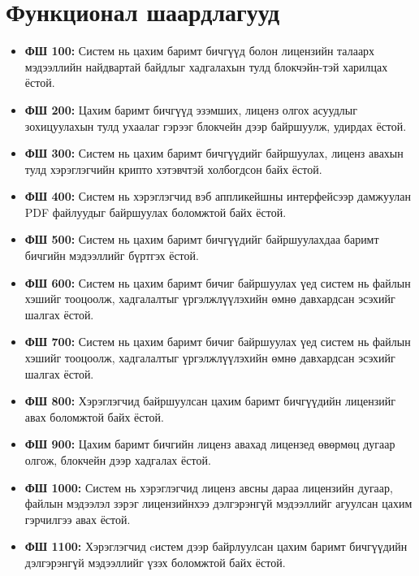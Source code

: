 \section{Функционал шаардлагууд}
\begin{itemize}
      \item \textbf{ФШ 100:} Систем нь цахим баримт бичгүүд болон лицензийн талаарх мэдээллийн найдвартай байдлыг хадгалахын тулд блокчэйн-тэй харилцах ёстой.
      \item \textbf{ФШ 200:} Цахим баримт бичгүүд эзэмших, лиценз олгох асуудлыг зохицуулахын тулд ухаалаг гэрээг блокчейн дээр байршуулж, удирдах ёстой.
      \item \textbf{ФШ 300:} Систем нь цахим баримт бичгүүдийг байршуулах, лиценз авахын тулд  хэрэглэгчийн крипто хэтэвчтэй холбогдсон байх ёстой.
      \item \textbf{ФШ 400:} Систем нь хэрэглэгчид вэб аппликейшны интерфейсээр дамжуулан PDF файлуудыг байршуулах боломжтой байх ёстой.
      \item \textbf{ФШ 500:} Систем нь цахим баримт бичгүүдийг байршуулахдаа баримт бичгийн мэдээллийг бүртгэх ёстой.
      \item \textbf{ФШ 600:} Систем нь цахим баримт бичиг байршуулах үед систем нь файлын хэшийг тооцоолж, хадгалалтыг үргэлжлүүлэхийн өмнө давхардсан эсэхийг шалгах ёстой.
      \item \textbf{ФШ 700:} Систем нь цахим баримт бичиг байршуулах үед систем нь файлын хэшийг тооцоолж, хадгалалтыг үргэлжлүүлэхийн өмнө давхардсан эсэхийг шалгах ёстой.
      \item \textbf{ФШ 800:} Хэрэглэгчид байршуулсан цахим баримт бичгүүдийн лицензийг авах боломжтой байх ёстой.
      \item \textbf{ФШ 900:} Цахим баримт бичгийн лиценз авахад лицензед өвөрмөц дугаар олгож, блокчейн дээр хадгалах ёстой.
      \item \textbf{ФШ 1000:} Систем нь хэрэглэгчид лиценз авсны дараа лицензийн дугаар, файлын мэдээлэл зэрэг лицензийнхээ дэлгэрэнгүй мэдээллийг агуулсан цахим гэрчилгээ авах ёстой.
      \item \textbf{ФШ 1100:} Хэрэглэгчид cистем дээр байрлуулсан цахим баримт бичгүүдийн дэлгэрэнгүй мэдээллийг үзэх боломжтой байх ёстой.
\end{itemize}


